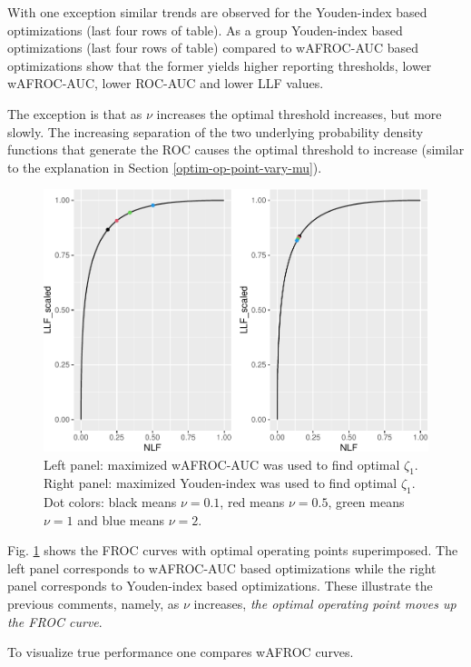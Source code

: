 \documentclass[
]{book}
\begin{document}
With one exception similar trends are observed for the Youden-index based optimizations (last four rows of table). As a group Youden-index based optimizations (last four rows of table) compared to wAFROC-AUC based optimizations show that the former yields higher reporting thresholds, lower wAFROC-AUC, lower ROC-AUC and lower LLF values.

The exception is that as \(\nu\) increases the optimal threshold increases, but more slowly. The increasing separation of the two underlying probability density functions that generate the ROC causes the optimal threshold to increase (similar to the explanation in Section \ref{optim-op-point-vary-mu}).

\begin{figure}
\centering
\includegraphics{21-optim-op-point_files/figure-latex/optim-op-point-vary-nu-1.pdf}
\caption{\label{fig:optim-op-point-vary-nu}Left panel: maximized wAFROC-AUC was used to find optimal \(\zeta_1\). Right panel: maximized Youden-index was used to find optimal \(\zeta_1\). Dot colors: black means \(\nu = 0.1\), red means \(\nu = 0.5\), green means \(\nu = 1\) and blue means \(\nu = 2\).}
\end{figure}

Fig. \ref{fig:optim-op-point-vary-nu} shows the FROC curves with optimal operating points superimposed. The left panel corresponds to wAFROC-AUC based optimizations while the right panel corresponds to Youden-index based optimizations. These illustrate the previous comments, namely, as \(\nu\) increases, \emph{the optimal operating point moves up the FROC curve}.

To visualize true performance one compares wAFROC curves.
\end{document}
